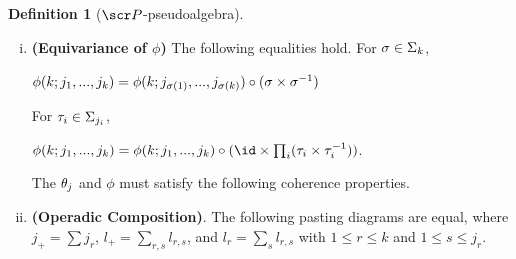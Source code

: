 \documentclass{amsart}
\theoremstyle{definition}
\newtheorem{defn}{Definition}[section]
\numberwithin{equation}{section}
\begin{document}
\begin{defn}[$\sP$-pseudoalgebra]
\begin{enumerate}[(i)]
\[\begin{tikzcd}
	{\sP(j)\times \sA^j} & {\sP(j)\times \sA^j} \\
	{\sP(j)\times \sA^j} & \sA
	\arrow["{1\times \rho}", from=1-1, to=1-2]
	\arrow["{\rho \times 1}"', from=1-1, to=2-1]
	\arrow["{\theta_j}", from=1-2, to=2-2]
	\arrow["{\theta_j}"', from=2-1, to=2-2]
\end{tikzcd}\label{diag:example}\]
\item \textbf{(Equivariance of $\phi$)} The following equalities hold.  For  $\sigma\in \Sigma_k$,  
\begin{center}
    $\phi(k;j_1,...,j_k) = \phi(k; j_{\sigma(1)},...,j_{\sigma(k)})\circ (\sigma\times \sigma^{-1})$
\end{center}
For $\tau_i\in \Sigma_{j_i}$, 
\begin{center}
    $\phi(k;j_1,...,j_k) = \phi(k; j_1,...,j_k)\circ (\id \times \prod_i (\tau_i\times \tau_i^{-1}))$.
\end{center}

The $\theta_j$ and $\phi$ must satisfy the following coherence properties.  

\item \textbf{(Operadic Composition)}.  The following pasting diagrams are equal, where \linebreak
$j_+ = \sum j_r$, $l_+ = \sum_{r,s} l_{r,s}$, and $l_r = \sum_s l_{r,s}$ with $1\leq r\leq k$ and $1\leq s\leq j_r$.


\end{enumerate}
\end{defn}
\end{document}
